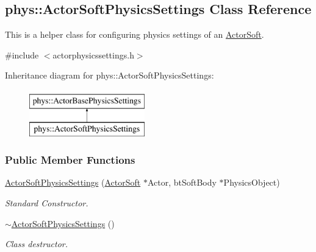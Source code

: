 \hypertarget{classphys_1_1ActorSoftPhysicsSettings}{
\subsection{phys::ActorSoftPhysicsSettings Class Reference}
\label{d0/d52/classphys_1_1ActorSoftPhysicsSettings}
}


This is a helper class for configuring physics settings of an \hyperlink{classphys_1_1ActorSoft}{ActorSoft}.  




{\ttfamily \#include $<$actorphysicssettings.h$>$}

Inheritance diagram for phys::ActorSoftPhysicsSettings:\begin{figure}[H]
\begin{center}
\leavevmode
\includegraphics[height=2.000000cm]{d0/d52/classphys_1_1ActorSoftPhysicsSettings}
\end{center}
\end{figure}
\subsubsection*{Public Member Functions}
\begin{DoxyCompactItemize}
\item 
\hyperlink{classphys_1_1ActorSoftPhysicsSettings_a4b5f0d9f1f4c36b3d429528cfbacf35c}{ActorSoftPhysicsSettings} (\hyperlink{classphys_1_1ActorSoft}{ActorSoft} $\ast$Actor, btSoftBody $\ast$PhysicsObject)
\begin{DoxyCompactList}\small\item\em Standard Constructor. \item\end{DoxyCompactList}\item 
\hypertarget{classphys_1_1ActorSoftPhysicsSettings_a9728c78b1bd9a7c1bc2c35619bc01a4a}{
\hyperlink{classphys_1_1ActorSoftPhysicsSettings_a9728c78b1bd9a7c1bc2c35619bc01a4a}{$\sim$ActorSoftPhysicsSettings} ()}
\label{d0/d52/classphys_1_1ActorSoftPhysicsSettings_a9728c78b1bd9a7c1bc2c35619bc01a4a}

\begin{DoxyCompactList}\small\item\em Class destructor. \item\end{DoxyCompactList}\end{DoxyCompactItemize}
